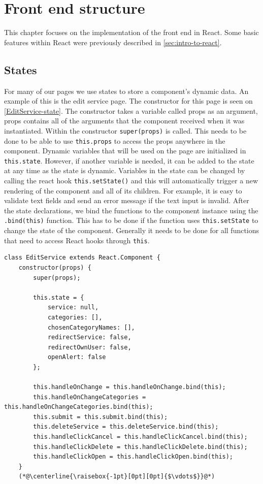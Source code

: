 \section{Front end structure}
This chapter focuses on the implementation of the front end in React.
Some basic features within React were previously described in \autoref{sec:intro-to-react}.

\subsection{States}
For many of our pages we use states to store a component's dynamic data. 
An example of this is the edit service page. 
The constructor for this page is seen on \autoref{EditService-state}.
The constructor takes a variable called props as an argument, props contains all of the arguments that the component received when it was instantiated. 
Within the constructor \texttt{super(props)} is called.
This needs to be done to be able to use \texttt{this.props} to access the props anywhere in the component.
Dynamic variables that will be used on the page are initialized in \texttt{this.state}. 
However, if another variable is needed, it can be added to the state at any time as the state is dynamic.
Variables in the state can be changed by calling the react hook \texttt{this.setState()} and this will automatically trigger a new rendering of the component and all of its children.
For example, it is easy to validate text fields and send an error message if the text input is invalid.  
After the state declarations, we bind the functions to the component instance using the \texttt{.bind(this)} function.
This has to be done if the function uses \texttt{this.setState} to change the state of the component.
Generally it needs to be done for all functions that need to access React hooks through \texttt{this}.
\begin{lstlisting}[caption={Constructor and state for edit service}, captionpos=b, label={EditService-state}]
class EditService extends React.Component {
    constructor(props) {
        super(props);
    
        this.state = {
            service: null,
            categories: [],
            chosenCategoryNames: [],
            redirectService: false,
            redirectOwnUser: false,
            openAlert: false
        };
            
        this.handleOnChange = this.handleOnChange.bind(this);
        this.handleOnChangeCategories = this.handleOnChangeCategories.bind(this);
        this.submit = this.submit.bind(this);
        this.deleteService = this.deleteService.bind(this);
        this.handleClickCancel = this.handleClickCancel.bind(this);
        this.handleClickDelete = this.handleClickDelete.bind(this);
        this.handleClickOpen = this.handleClickOpen.bind(this);
    }
    (*@\centerline{\raisebox{-1pt}[0pt][0pt]{$\vdots$}}@*)
\end{lstlisting}

